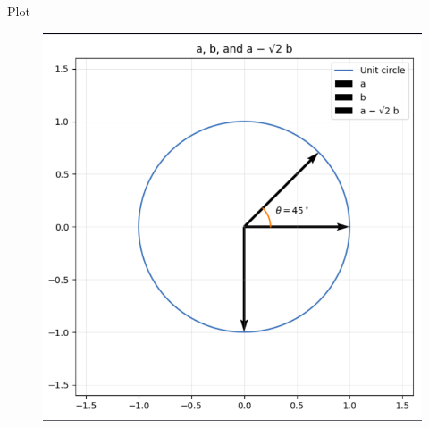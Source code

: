 \documentclass{beamer}
\begin{document}
\begin{frame}{Plot}
    \begin{figure}[H]
    \centering
    \includegraphics[width=0.65\columnwidth]{figs/mg3plot.png}
\end{figure}
\end{frame}
\end{document}

